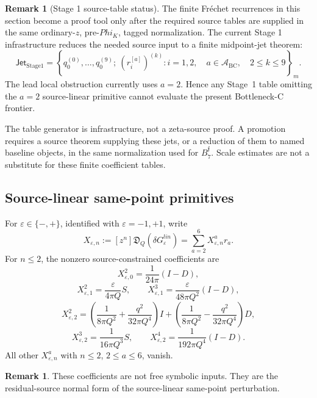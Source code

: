 \documentclass[11pt,a4paper]{amsart}
\def\Phi{Phi}%
\def\lin{lin}%
\theoremstyle{plain}
\theoremstyle{definition}
\newtheorem{remark}[theorem]{Remark}
\newcommand{\lin}{\mathrm{lin}}
\begin{document}
\begin{remark}[Stage 1 source-table status]
\label{rem:stage-one-source-table-status}
The finite Fr\'echet recurrences in this section become a proof tool only
after the required source tables are supplied in the same ordinary-\(z\),
pre-\(\Phi_K\), tagged normalization.  The current Stage 1 infrastructure
reduces the needed source input to a finite midpoint-jet theorem:
\[
\mathsf{Jet}_{\mathrm{Stage1}}
=
\left\{
q_0^{(0)},\ldots,q_0^{(9)};
\ (r_i^{[a]})^{(k)}
:
i=1,2,\quad a\in\mathcal A_{\mathrm{BC}},\quad 2\le k\le9
\right\}_{m}.
\]
The lead local obstruction currently uses \(a=2\).  Hence any Stage~1 table
omitting the \(a=2\) source-linear primitive cannot evaluate the present
Bottleneck-C frontier.

The table generator is infrastructure, not a zeta-source proof.  A promotion
requires a source theorem supplying these jets, or a reduction of them to
named baseline objects, in the same normalization used for
\(B_7^{\mathfrak f}\).  Scale estimates are not a substitute for these
finite coefficient tables.
\end{remark}

\subsection{Source-linear same-point primitives}
\label{subsec:source-linear-same-point-primitives}

For \(\varepsilon\in\{-,+\}\), identified with \(\varepsilon=-1,+1\), write
\[
X_{\varepsilon,n}
:=
[z^n]\mathfrak D_Q(\delta G_\varepsilon^{\lin})
=
\sum_{a=2}^{6}X_{\varepsilon,n}^a r_a.
\]
For \(n\le2\), the nonzero source-constrained coefficients are
\[
X_{\varepsilon,0}^2=\frac{1}{24\pi}(I-D),
\]
\[
X_{\varepsilon,1}^2=\frac{\varepsilon}{4\pi Q}S,
\qquad
X_{\varepsilon,1}^3=\frac{\varepsilon}{48\pi Q^2}(I-D),
\]
\[
X_{\varepsilon,2}^2
=
\left(
\frac{1}{8\pi Q^2}
+
\frac{q^2}{32\pi Q^4}
\right)I
+
\left(
\frac{1}{8\pi Q^2}
-
\frac{q^2}{32\pi Q^4}
\right)D,
\]
\[
X_{\varepsilon,2}^3=\frac{1}{16\pi Q^3}S,
\qquad
X_{\varepsilon,2}^4=\frac{1}{192\pi Q^4}(I-D).
\]
All other \(X_{\varepsilon,n}^a\) with \(n\le2\), \(2\le a\le6\), vanish.

\begin{remark}
\label{rem:source-linear-primitives-residual-normal-form}
These coefficients are not free symbolic inputs.  They are the residual-source
normal form of the source-linear same-point perturbation.
\end{remark}
\end{document}

